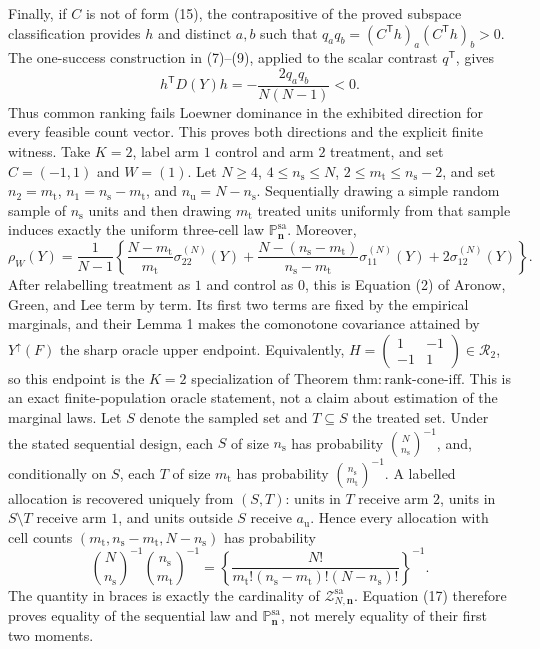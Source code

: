 Finally, if \(C\) is not of form (15), the contrapositive of the proved subspace classification provides \(h\) and distinct \(a,b\) such that \(q_aq_b=(C^{\mathsf T}h)_a(C^{\mathsf T}h)_b>0\).  The one-success construction in (7)--(9), applied to the scalar contrast \(q^{\mathsf T}\), gives
\[
h^{\mathsf T}D(Y)h=-\frac{2q_aq_b}{N(N-1)}<0. \tag{16}
\]
Thus common ranking fails Loewner dominance in the exhibited direction for every feasible count vector.  This proves both directions and the explicit finite witness.
Take \(K=2\), label arm \(1\) control and arm \(2\) treatment, and set \(C=(-1,1)\) and \(W=(1)\).  Let \(N\geq4\), \(4\leq n_{\mathrm s}\leq N\), \(2\leq m_{\mathrm t}\leq n_{\mathrm s}-2\), and set \(n_2=m_{\mathrm t}\), \(n_1=n_{\mathrm s}-m_{\mathrm t}\), and \(n_{\mathrm u}=N-n_{\mathrm s}\).  Sequentially drawing a simple random sample of \(n_{\mathrm s}\) units and then drawing \(m_{\mathrm t}\) treated units uniformly from that sample induces exactly the uniform three-cell law \(\mathbb P_{\mathbf n}^{\mathrm{sa}}\).  Moreover,
\[
\rho_W(Y)=\frac1{N-1}\left\{
\frac{N-m_{\mathrm t}}{m_{\mathrm t}}\sigma_{22}^{(N)}(Y)
+\frac{N-(n_{\mathrm s}-m_{\mathrm t})}{n_{\mathrm s}-m_{\mathrm t}}\sigma_{11}^{(N)}(Y)
+2\sigma_{12}^{(N)}(Y)\right\}. 
\]
After relabelling treatment as \(1\) and control as \(0\), this is Equation (2) of Aronow, Green, and Lee term by term.  Its first two terms are fixed by the empirical marginals, and their Lemma 1 makes the comonotone covariance attained by \(Y^{\uparrow}(F)\) the sharp oracle upper endpoint.  Equivalently, \(H=\left(\begin{smallmatrix}1&-1\\-1&1\end{smallmatrix}\right)\in\mathcal R_2\), so this endpoint is the \(K=2\) specialization of Theorem \(\mathrm{thm{:}rank\text{-}cone\text{-}iff}\).  This is an exact finite-population oracle statement, not a claim about estimation of the marginal laws.
Let \(S\) denote the sampled set and \(T\subseteq S\) the treated set.  Under the stated sequential design, each \(S\) of size \(n_{\mathrm s}\) has probability \(\binom N{n_{\mathrm s}}^{-1}\), and, conditionally on \(S\), each \(T\) of size \(m_{\mathrm t}\) has probability \(\binom{n_{\mathrm s}}{m_{\mathrm t}}^{-1}\).  A labelled allocation is recovered uniquely from \((S,T)\): units in \(T\) receive arm \(2\), units in \(S\setminus T\) receive arm \(1\), and units outside \(S\) receive \(a_{\mathrm u}\).  Hence every allocation with cell counts \((m_{\mathrm t},n_{\mathrm s}-m_{\mathrm t},N-n_{\mathrm s})\) has probability
\[
\binom N{n_{\mathrm s}}^{-1}\binom{n_{\mathrm s}}{m_{\mathrm t}}^{-1}
=\left\{\frac{N!}{m_{\mathrm t}!(n_{\mathrm s}-m_{\mathrm t})!(N-n_{\mathrm s})!}\right\}^{-1}. \tag{17}
\]
The quantity in braces is exactly the cardinality of \(\mathcal Z_{N,\mathbf n}^{\mathrm{sa}}\).  Equation (17) therefore proves equality of the sequential law and \(\mathbb P_{\mathbf n}^{\mathrm{sa}}\), not merely equality of their first two moments.

